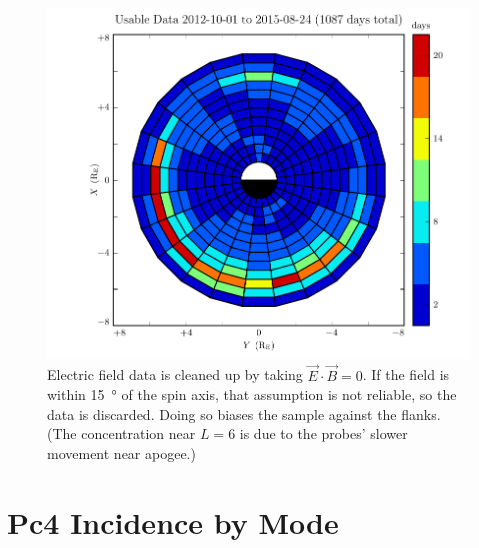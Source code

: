 \begin{figure}[!htb]
    \centering
    \includegraphics[width=\textwidth]{figures/pos.pdf}
    \caption[Spatial Distribution of Usable Van Allen Probe Data]{
      Electric field data is cleaned up by taking $\vec{E} \cdot \vec{B} = 0$. If the field is within \SI{15}{\degree} of the spin axis, that assumption is not reliable, so the data is discarded. Doing so biases the sample against the flanks. (The concentration near $L=6$ is due to the probes' slower movement near apogee.) 
    }
    \label{fig_pos}
\end{figure}

\section{Pc4 Incidence by Mode}
  \label{sec_rate}

